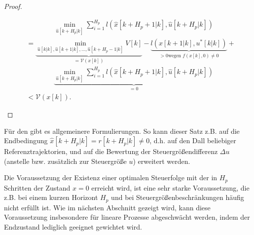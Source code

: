 \begin{proof}
\begin{enumerate}
\begin{align*}
  	& \qquad \qquad \min\limits_{\hat{u}[k+H_p|k]}\sum\limits_{i=1}^{H_p}l\left( \hat{x}[k+H_p+1|k],\hat{u}[k+H_p|k] \right)\\
  	& = \underbrace{ \min\limits_{\hat{u}[k|k],\hat{u}[k+1|k],\ldots,\hat{u}[k+H_p-1|k]}V[k] }_{=\mathcal{V}(x[k])}-\underbrace{ l\left( \hat{x}[k+1|k],u^{\ast}[k|k] \right) }_{>0\text{
  	wegen }f(x[k],0)\neq 0}+\\
  	& \qquad\qquad \underbrace{ \min\limits_{\hat{u}[k+H_p|k]}\sum\limits_{i=1}^{H_p}l\left( \hat{x}[k+H_p+1|k],\hat{u}[k+H_p|k] \right) }_{=0}\\
  	& < \mathcal{V}(x[k]).
  \end{align*}
\end{enumerate}
\end{proof}
\begin{remark}
Für den  gibt es allgemeinere Formulierungen. So kann dieser Satz z.B. auf die Endbedingung $\hat{x}[k+H_p|k]=r[k+H_p|k]\neq 0$, d.h. auf den Dall
beliebiger Referenztrajektorien, und auf die Bewertung der Steuergrößendifferenz $\Delta u$ (anstelle bzw. zusätzlich zur Steuergröße $u$) erweitert werden.
\end{remark}
Die Voraussetzung der Existenz einer optimalen Steuerfolge mit der in $H_p$ Schritten der Zustand $x=0$ erreicht wird, ist eine sehr starke Voraussetzung, die z.B. bei einem kurzen
Horizont $H_p$ und bei Steuergrößenbeschränkungen häufig nicht erfüllt ist. Wie im nächsten Abschnitt gezeigt wird, kann diese Voraussetzung insbesondere für lineare Prozesse
abgeschwächt werden, indem der Endzustand lediglich geeignet gewichtet wird.

